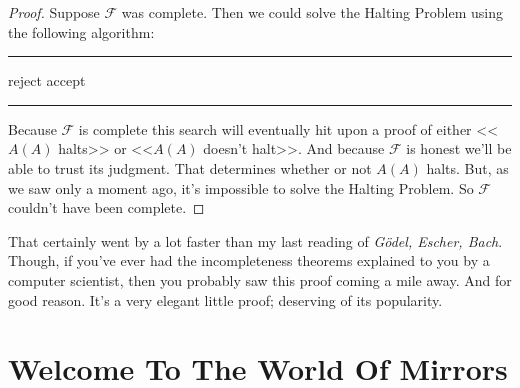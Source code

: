 \documentclass{article}
\theoremstyle{customstyle}
\newcommand{\F}{\ensuremath{\mathcal{F}}}
\newenvironment{algo}{\begin{samepage}\medskip\hrule\begin{algorithmic}}{\end{algorithmic}\hrule\medskip\end{samepage}}
\begin{document}
\begin{proof}
Suppose $\F$ was complete. Then we could solve the Halting Problem using the following algorithm:
\begin{algo}
      \State reject
    \EndIf
      \State accept
    \EndIf
  \EndFor
\EndFunction
\end{algo}
Because $\F$ is complete this search will eventually hit upon a proof of  either <<$A(A)$ halts>> or <<$A(A)$ doesn't halt>>. And because $\F$ is honest we'll be able to trust its judgment. That determines whether or not $A(A)$ halts. But, as we saw only a moment ago, it's impossible to solve the Halting Problem. So $\F$ couldn't have been complete. \lightning
\end{proof}

That certainly went by a lot faster than my last reading of \textit{Gödel, Escher, Bach}. Though, if you've ever had the incompleteness theorems explained to you by a computer scientist, then you probably saw this proof coming a mile away. And for good reason. It's a very elegant little proof; deserving of its popularity.

\section{Welcome To The World Of Mirrors}
\end{document}
